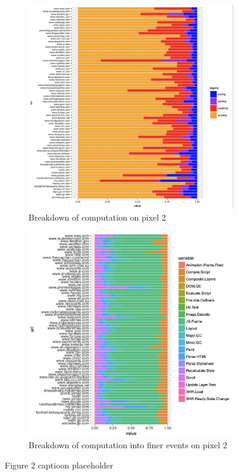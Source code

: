 \begin{figure}[!bth]
\begin{subfigure}[b]{0.5\textwidth}
\centering
\includegraphics[width=0.9\columnwidth]{figs/cat_p2.png}
\caption{Breakdown of computation on pixel 2}
\label{fig:act_p2}
\end{subfigure}
\begin{subfigure}[b]{0.5\textwidth}
\centering
\includegraphics[width=0.9\columnwidth]{figs/act_p2.png}
\caption{Breakdown of computation into finer events on pixel 2}
\label{fig:cat_p2}
\end{subfigure}
\caption{{\color{red}Figure 2 captioon placeholder}}
\end{figure}
